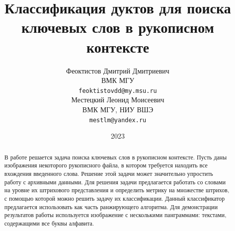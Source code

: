 \documentclass{article}
\title{Классификация дуктов для поиска ключевых слов в рукописном контексте}
\author{ Феоктистов Дмитрий Дмитриевич \\
	ВМК МГУ\\
	\texttt{feoktistovdd@my.msu.ru} \\
	\And
	Местецкий Леонид Моисеевич \\
	ВМК МГУ, НИУ ВШЭ\\
	\texttt{mestlm@yandex.ru} \\
}
\date{2023}
\begin{document}
\maketitle
\begin{abstract}
	В работе решается задача поиска ключевых слов в рукописном контексте. Пусть даны изображения некоторого рукописного файла, в котором требуется находить все вхождения введенного слова. Решение этой задачи может значительно упростить работу с архивными данными. Для решения задачи предлагается работать со словами на уровне их штрихового представления и определить метрику на множестве штрихов, с помощью которой можно решить задачу их классификации. Данный классификатор предлагается использовать как часть ранжирующего алгоритма. Для демонстрации результатов работы используется изображение с несколькими панграммами: текстами, содержащими все буквы алфавита.
\end{abstract}


\end{document}

